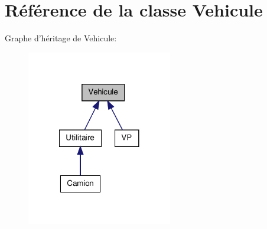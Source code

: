 \hypertarget{class_vehicule}{
\section{Référence de la classe Vehicule}
\label{class_vehicule}
}


Graphe d'héritage de Vehicule:
\nopagebreak
\begin{figure}[H]
\begin{center}
\leavevmode
\includegraphics[width=180pt]{class_vehicule__inherit__graph}
\end{center}
\end{figure}
